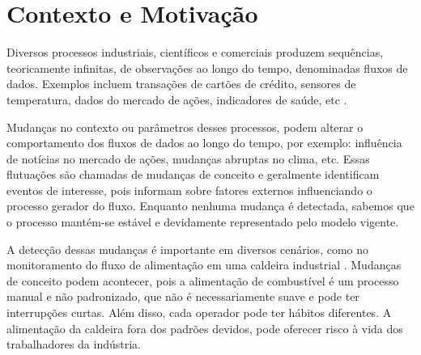 \documentclass[qual, classic, a4paper]{ufbathesis}
\begin{document}
\tableofcontents

\listoffigures

\listoftables

\mainmatter

% 
% 
% 
%

 \label{introducao}

\section{Contexto e Motivação}

Diversos processos industriais, científicos e comerciais produzem sequências, teoricamente infinitas, de observações ao longo do tempo, denominadas fluxos de dados. Exemplos incluem transações de cartões de crédito, sensores de temperatura, dados do mercado de ações, indicadores de saúde, etc \cite{Aggarwal:2003:FCE:1315451.1315460}. 

Mudanças no contexto ou parâmetros desses processos, podem alterar o comportamento dos fluxos de dados ao longo do tempo, por exemplo: influência de notícias no mercado de ações, mudanças abruptas no clima, etc. 
Essas flutuações são chamadas de mudanças de conceito e geralmente identificam eventos de interesse, pois informam sobre fatores externos influenciando o processo gerador do fluxo. Enquanto nenhuma mudança é detectada, sabemos que o processo mantém-se estável e devidamente representado pelo modelo vigente.
 
A detecção dessas mudanças é importante em diversos cenários, como no monitoramento do fluxo de alimentação em uma caldeira industrial \cite{6294406}. Mudanças de conceito podem acontecer, pois a alimentação de combustível é um processo manual e não padronizado, que não é necessariamente suave e pode ter interrupções curtas. Além disso, cada operador pode ter hábitos diferentes. 
A alimentação da caldeira fora dos padrões devidos, pode oferecer risco à vida dos trabalhadores da indústria.
\end{document}
